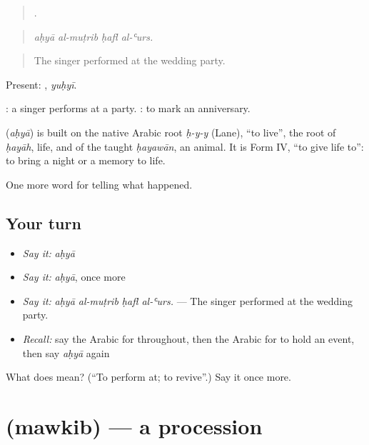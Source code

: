 \begin{quote}
   .
\end{quote}

\begin{quote}
\emph{aḥyā al-muṭrib ḥafl al-ʿurs.}
\end{quote}

\begin{quote}
The singer performed at the wedding party.
\end{quote}

Present: , \emph{yuḥyī}.

 : a singer performs at a party.  : to mark an anniversary.

\begin{cousinweb}
\textbf{} (\emph{aḥyā}) is built on the native Arabic root \emph{ḥ-y-y} (Lane), \textquotedblleft{}to live\textquotedblright{}, the root of \emph{ḥayāh}, life, and of the taught \emph{ḥayawān}, an animal. It is Form IV, \textquotedblleft{}to give life to\textquotedblright{}: to bring a night or a memory to life.
\end{cousinweb}

\begin{grammarlens}[title={What you've built}]
One more word for telling what happened.
\end{grammarlens}

\subsection*{Your turn}
\begin{itemize}
\raggedright
  \item \emph{Say it:} \emph{aḥyā}
  \item \emph{Say it:} \emph{aḥyā}, once more
  \item \emph{Say it:} \emph{aḥyā al-muṭrib ḥafl al-ʿurs.} — The singer performed at the wedding party.
  \item \emph{Recall:} say the Arabic for throughout, then the Arabic for to hold an event, then say \emph{aḥyā} again
\end{itemize}

\begin{tcolorbox}[breakable,colback=teal!4,colframe=teal!35!black,title={Before you move on}]
What does  mean? (\textquotedblleft{}To perform at; to revive\textquotedblright{}.) Say it once more.
\end{tcolorbox}
\section[\texorpdfstring{\ar{موكب} (mawkib)}{موكب (mawkib)}]{ (mawkib) — a procession}

